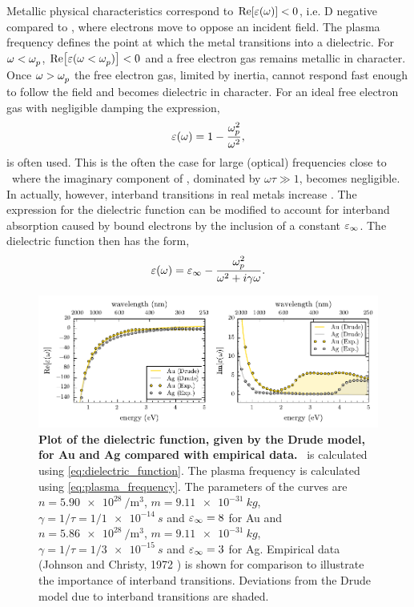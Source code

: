 \documentclass{article}
\begin{document}
Metallic physical characteristics correspond to $\mathrm{Re}\!\left[{\varepsilon(\omega)}\right]<0$, {\color{red}i.e. \gls{D} negative compared to }, where electrons move to oppose an incident field. The plasma frequency defines the point at which the metal transitions into a dielectric. For $\omega<\omega_{p}^{}$, $\mathrm{Re}\!\left[{\varepsilon(\omega<\omega_{p}^{})}\right] < 0$ and a free electron gas remains metallic in character. Once $\omega > \omega_{p}^{}$ the free electron gas{\color{red}, limited by inertia,} cannot respond fast enough to follow the field and becomes dielectric in character.
For an ideal free electron gas with negligible damping the expression,
\begin{equation}
	\dielectric = 1 - \frac{\omegap[2]}{\omega^2},
	\label{eq:dielectric_approx}
\end{equation}
is often used. This is the often the case for large {\color{red}(optical)} frequencies close to \omegap\ where the imaginary component of \dielectric, dominated by $\omega\tau\gg 1$, becomes negligible. In actually, however, interband transitions in real metals increase \imag{\dielectric}.
The expression for the dielectric function can be modified to account for interband absorption caused by bound electrons by the inclusion of a constant $\varepsilon_\infty$. The dielectric function then has the form,
\begin{equation}
	\dielectric = \eps_\infty - \frac{\omegap[2]}{\omega^2 + i\gamma\omega}.
	\label{eq:dielectric_function}
\end{equation}

\begin{figure}[bt]
\centering
\includegraphics{figures/dielectric_function}
\caption[Plot of the dielectric function, given by the Drude model, for Au and Ag compared with empirical data]{\textbf{Plot of the dielectric function, given by the Drude model, for Au and Ag compared with empirical data.} \dielectric\ is calculated using \eqref{eq:dielectric_function}. The plasma frequency is calculated using \eqref{eq:plasma_frequency}. The parameters of the curves are $n=\SI{5.90e28}{\per\metre\cubed}$, $m=\SI{9.11e-31}{kg}$, $\gamma=1/\tau=1/\SI{1e-14}{s}$ and $\varepsilon_\infty = 8$ for Au and $n=\SI{5.86e28}{\per\metre\cubed}$, $m=\SI{9.11e-31}{kg}$, $\gamma=1/\tau=1/\SI{3e-15}{s}$ and $\varepsilon_\infty = 3$ for Ag. Empirical data (Johnson and Christy, 1972 \cite{johnson1972optical}) is shown for comparison to illustrate the importance of interband transitions. Deviations from the Drude model due to interband transitions are shaded.}
\label{fig:dielectric_function}
\end{figure}
\end{document}
